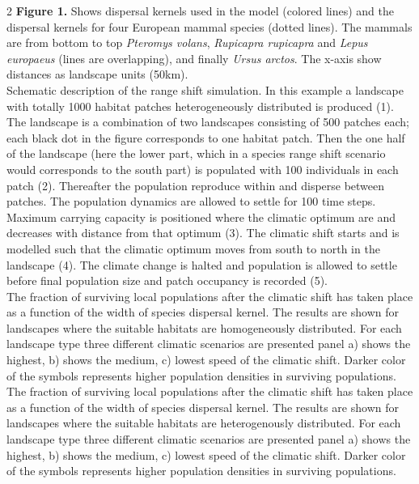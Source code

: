 \documentclass[12pt,pdftex]{article}
\begin{document}
\begin{spacing}{2}
{\bf Figure 1.} Shows dispersal kernels used in the model (colored lines) and the dispersal kernels for four European mammal species (dotted lines). The mammals are from bottom to top {\em Pteromys volans}, {\em Rupicapra rupicapra} and {\em Lepus europaeus} (lines are overlapping), and finally {\em Ursus arctos}. The x-axis show distances as landscape units (50km). \\

 Schematic description of the range shift simulation. In this example a landscape with totally 1000 habitat patches heterogeneously distributed is produced (1). The landscape is a combination of two landscapes consisting of 500 patches each;  each black dot in the figure corresponds to one habitat patch. Then the one half of the landscape (here the lower part, which in a species range shift scenario would corresponds to the south part) is populated with 100 individuals in each patch (2). Thereafter the population reproduce within and disperse between patches. The population dynamics are allowed to settle for 100 time steps. Maximum carrying capacity is positioned where the climatic optimum are and decreases with distance from that optimum (3). The climatic shift starts and is modelled such that the climatic optimum moves from south to north in the landscape (4). The climate change is halted and population is allowed to settle before final population size and patch occupancy is recorded (5).\\


 The fraction of surviving local populations after the climatic shift has taken place as a function of the width of species dispersal kernel. The results are shown for landscapes where the suitable habitats are homogeneously distributed. For each landscape type three different climatic scenarios are presented panel a) shows the highest, b)  shows the medium, c) lowest speed of the climatic shift. Darker color of the symbols represents higher population densities in surviving populations.\\

 The fraction of surviving local populations after the climatic shift has taken place as a function of the width of species dispersal kernel. The results are shown for landscapes where the suitable habitats are heterogenously distributed. For each landscape type three different climatic scenarios are presented panel a) shows the highest, b)  shows the medium, c) lowest speed of the climatic shift. Darker color of the symbols represents higher population densities in surviving populations.\\


\end{spacing}
\end{document}
